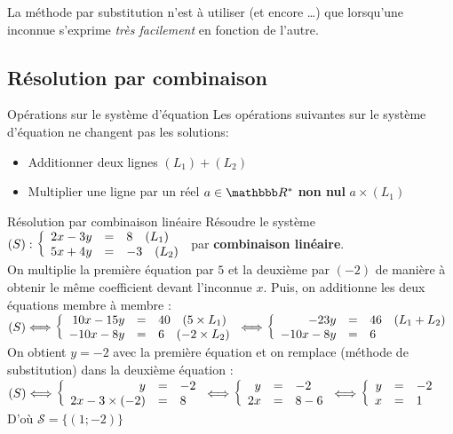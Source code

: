 \documentclass[10pt,a4paper,openany,twoside, eleve]{book}
\begin{document}
\vspace{-4mm}
\begin{rem}{}{}
  La méthode par substitution n'est à utiliser (et encore \dots) que lorsqu'une inconnue s'exprime \emph{très facilement} en fonction de l'autre.
\end{rem}

\vspace{-3mm}
\subsection{Résolution par combinaison}

\begin{prop}{Opérations sur le système d'équation}{}
   Les opérations suivantes sur le système d'équation ne changent pas les solutions:
   \begin{itemize}
      \item Additionner deux lignes $(L_1) + (L_2)$
      \item Multiplier une ligne par un réel $a\in\R^*$ \textbf{non nul} $a\times(L_1)$
   \end{itemize}
\end{prop}

\begin{methode}{Résolution par combinaison linéaire}{}
Résoudre le système $(S):\left\{\begin{array}{rcl} 2x-3y&=&8\quad(L_1) \\ 5x+4y&=&-3\quad(L_2) \end{array}\right.$ par \textbf{combinaison linéaire}. \\

\noindent On multiplie la première équation par $5$ et la deuxième par $(-2)$ de manière à obtenir le même coefficient devant l'inconnue $x$. Puis, on additionne les deux équations membre à membre : \\

$(S) \Longleftrightarrow \left\{\begin{array}{rcl} 10x-15y&=&40\quad(5\times L_1) \\ -10x-8y&=&6\quad(-2 \times L_2) \end{array}\right. \Longleftrightarrow \left\{\begin{array}{rcl} -23y&=&46 \quad (L_1+L_2) \\ -10x-8y&=&6 \end{array}\right.$\\

\noindent On obtient $y=-2$ avec la première équation et on remplace (méthode de substitution) dans la deuxième équation :\\

$(S) \Longleftrightarrow \left\{\begin{array}{rcl} y&=&-2 \\ 2x-3\times(-2)&=&8 \end{array}\right. \Longleftrightarrow \left\{\begin{array}{rcl} y&=&-2 \\ 2x&=&8-6 \end{array}\right. \Longleftrightarrow \left\{\begin{array}{rcl} y&=&-2 \\ x&=&1 \end{array}\right.$  \\

\noindent D'où $\mathcal{S}=\{(1;-2)\}$ \\

\end{methode}
\end{document}
